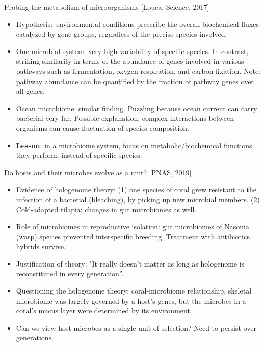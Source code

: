 \documentclass{report}
\begin{document}
Probing the metabolism of microorganisms [Louca, Science, 2017]
\begin{itemize}
	\item Hypothesis: environmental conditions prescribe the overall biochemical fluxes catalyzed by gene groups, regardless of the precise species involved.
	
	\item One microbial system: very high variability of specific species. In contrast, striking similarity in terms of the abundance of genes involved in various pathways such as fermentation, oxygen respiration, and carbon fixation. Note: pathway abundance can be quantified by the fraction of pathway genes over all genes.
	
	\item Ocean microbiome: similar finding. Puzzling because ocean current can carry bacterial very far. Possible explanation: complex interactions between organisms can cause fluctuation of species composition.
	
	\item \textbf{Lesson}: in a microbiome system, focus on metabolic/biochemical functions they perform, instead of specific species.
\end{itemize}

Do hosts and their microbes evolve as a unit? [PNAS, 2019]
\begin{itemize}
	\item Evidence of hologenome theory: (1) one species of coral grew resistant to the infection of a bacterial (bleaching), by picking up new microbial members. (2) Cold-adapted tilapia: changes in gut microbiomes as well.
	
	\item Role of microbiomes in reproductive isolation: gut microbiomes of Nasonia (wasp) species prevented interspecific breeding. Treatment with antibiotics, hybrids survive.
	
	\item Justification of theory: "It really doesn’t matter as long as hologenome is reconstituted in every generation”.
	
	\item Questioning the hologenome theory: coral-microbiome relationship, skeletal microbiome was largely governed by a host’s genes, but the microbes in a coral’s mucus layer were determined by its environment.
	
	\item Can we view host-microbes as a single unit of selection? Need to persist over generations.
\end{itemize}
\end{document}
